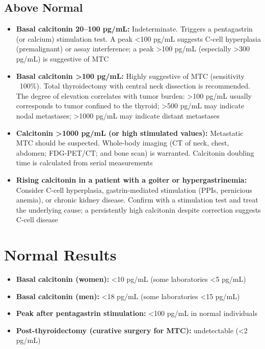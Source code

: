\subsection*{Above Normal}
\begin{itemize}
  \item \textbf{Basal calcitonin 20--100 pg/mL:} Indeterminate. Triggers a pentagastrin (or calcium) stimulation test. A peak <100 pg/mL suggests C-cell hyperplasia (premalignant) or assay interference; a peak >100 pg/mL (especially >300 pg/mL) is suggestive of MTC
  \item \textbf{Basal calcitonin >100 pg/mL:} Highly suggestive of MTC (sensitivity ~100\%). Total thyroidectomy with central neck dissection is recommended. The degree of elevation correlates with tumor burden: >100 pg/mL usually corresponds to tumor confined to the thyroid; >500 pg/mL may indicate nodal metastases; >1000 pg/mL may indicate distant metastases
  \item \textbf{Calcitonin >1000 pg/mL (or high stimulated values):} Metastatic MTC should be suspected. Whole-body imaging (CT of neck, chest, abdomen; FDG-PET/CT; and bone scan) is warranted. Calcitonin doubling time is calculated from serial measurements
  \item \textbf{Rising calcitonin in a patient with a goiter or hypergastrinemia:} Consider C-cell hyperplasia, gastrin-mediated stimulation (PPIs, pernicious anemia), or chronic kidney disease. Confirm with a stimulation test and treat the underlying cause; a persistently high calcitonin despite correction suggests C-cell disease
\end{itemize}

\section*{Normal Results}
\begin{itemize}
  \item \textbf{Basal calcitonin (women):} <10 pg/mL (some laboratories <5 pg/mL)
  \item \textbf{Basal calcitonin (men):} <18 pg/mL (some laboratories <15 pg/mL)
  \item \textbf{Peak after pentagastrin stimulation:} <100 pg/mL in normal individuals
  \item \textbf{Post-thyroidectomy (curative surgery for MTC):} undetectable (<2 pg/mL)
\end{itemize}

